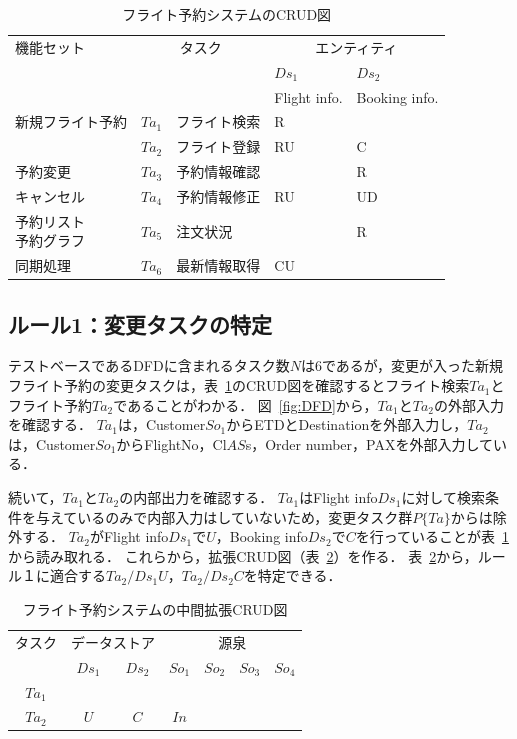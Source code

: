 \documentclass[a4paper,12pt]{jreport}
\begin{document}
\begin{table}[t]
\caption{フライト予約システムのCRUD図}
\label{CRUD}
\begin{center}
{\footnotesize
\begin{tabular}{p{1.7 cm}|c|p{1.5 cm}||p{1 cm}|p{1cm}}
\hline
機能セット&\multicolumn{2}{c||}{タスク}&\multicolumn{2}{c}{エンティティ}\\
&\multicolumn{2}{c||}{}&$Ds_1$&$Ds_2$\\
&\multicolumn{2}{c||}{}&Flight info.&Booking info.\\
\cline{4-5}
\hline\hline
新規フライト予約&$Ta_1$&フライト検索&R&\\
\cline{2-5}
&$Ta_2$&フライト登録&RU&C\\
\hline
予約変更&$Ta_3$&予約情報確認&&R\\
\cline{2-5}
キャンセル&$Ta_4$&予約情報修正&RU&UD\\
\hline
\shortstack{予約リスト\\予約グラフ}&$Ta_5$&注文状況&&R\\
\hline
\cline{2-5}
同期処理&$Ta_6$&最新情報取得&CU&\\
\hline
\end{tabular}
}
\end{center}
\end{table}%


\subsection{ルール1：変更タスクの特定}
テストベースであるDFDに含まれるタスク数$N$は6であるが，変更が入った新規フライト予約の変更タスクは，表~\ref{CRUD}のCRUD図を確認するとフライト検索$Ta_1$とフライト予約$Ta_2$であることがわかる．
図~\ref{fig:DFD}から，$Ta_1$と$Ta_2$の外部入力を確認する．
$Ta_1$は，Customer$So_1$からETDとDestinationを外部入力し，$Ta_2$は，Customer$So_1$からFlightNo，Cl$AS$s，Order number，PAXを外部入力している．

続いて，$Ta_1$と$Ta_2$の内部出力を確認する．
$Ta_1$はFlight info$Ds_1$に対して検索条件を与えているのみで内部入力はしていないため，変更タスク群$P\{Ta\}$からは除外する．
$Ta_2$がFlight info$Ds_1$で$U$，Booking info$Ds_2$で$C$を行っていることが表~\ref{CRUD}から読み取れる．
これらから，拡張CRUD図（表~\ref{ECRUD1}）を作る．
表~\ref{ECRUD1}から，ルール１に適合する$Ta_2/Ds_1U$，$Ta_2/Ds_2C$を特定できる．

\begin{table}[t]
\caption{フライト予約システムの中間拡張CRUD図}
\label{ECRUD1}
\begin{center}
\begin{tabular}{c||c|c||c|c|c|c}
\hline
タスク&\multicolumn{2}{c||}{データストア}&\multicolumn{4}{c}{源泉}\\
&$Ds_1$&$Ds_2$&$So_1$&$So_2$&$So_3$&$So_4$\\
\hline\hline
$Ta_1$&&&&&&\\
\hline
$Ta_2$&$U$&$C$&$In$&&&\\
\hline
\end{tabular}
\end{center}
\end{table}%
\end{document}
